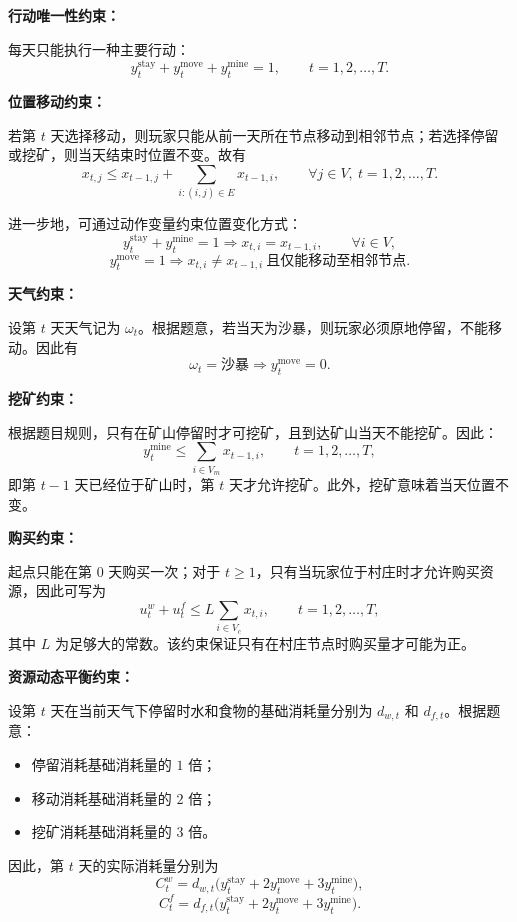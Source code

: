 \documentclass[UTF8,a4paper,12pt]{ctexart}
\begin{document}
\noindent\textbf{行动唯一性约束：}

每天只能执行一种主要行动：
\[
y_t^{\mathrm{stay}}+y_t^{\mathrm{move}}+y_t^{\mathrm{mine}}=1,\qquad t=1,2,\dots,T.
\]

\noindent\textbf{位置移动约束：}

若第 $t$ 天选择移动，则玩家只能从前一天所在节点移动到相邻节点；若选择停留或挖矿，则当天结束时位置不变。故有
\[
x_{t,j}\le x_{t-1,j}+\sum_{i:(i,j)\in E}x_{t-1,i},\qquad \forall j\in V,\ t=1,2,\dots,T.
\]

进一步地，可通过动作变量约束位置变化方式：
\[
y_t^{\mathrm{stay}}+y_t^{\mathrm{mine}}=1 \Longrightarrow x_{t,i}=x_{t-1,i},\qquad \forall i\in V,
\]
\[
y_t^{\mathrm{move}}=1 \Longrightarrow x_{t,i}\neq x_{t-1,i}\ \text{且仅能移动至相邻节点}.
\]

\noindent\textbf{天气约束：}

设第 $t$ 天天气记为 $\omega_t$。根据题意，若当天为沙暴，则玩家必须原地停留，不能移动。因此有
\[
\omega_t=\text{沙暴} \Longrightarrow y_t^{\mathrm{move}}=0.
\]

\noindent\textbf{挖矿约束：}

根据题目规则，只有在矿山停留时才可挖矿，且到达矿山当天不能挖矿。因此：
\[
y_t^{\mathrm{mine}}\le \sum_{i\in V_m}x_{t-1,i},\qquad t=1,2,\dots,T,
\]
即第 $t-1$ 天已经位于矿山时，第 $t$ 天才允许挖矿。此外，挖矿意味着当天位置不变。

\noindent\textbf{购买约束：}

起点只能在第 $0$ 天购买一次；对于 $t\ge 1$，只有当玩家位于村庄时才允许购买资源，因此可写为
\[
u_t^w+u_t^f \le L\sum_{i\in V_c}x_{t,i},\qquad t=1,2,\dots,T,
\]
其中 $L$ 为足够大的常数。该约束保证只有在村庄节点时购买量才可能为正。

\noindent\textbf{资源动态平衡约束：}

设第 $t$ 天在当前天气下停留时水和食物的基础消耗量分别为 $d_{w,t}$ 和 $d_{f,t}$。根据题意：

\begin{itemize}
    \item 停留消耗基础消耗量的 $1$ 倍；
    \item 移动消耗基础消耗量的 $2$ 倍；
    \item 挖矿消耗基础消耗量的 $3$ 倍。
\end{itemize}

因此，第 $t$ 天的实际消耗量分别为
\[
C_t^w=d_{w,t}\bigl(y_t^{\mathrm{stay}}+2y_t^{\mathrm{move}}+3y_t^{\mathrm{mine}}\bigr),
\]
\[
C_t^f=d_{f,t}\bigl(y_t^{\mathrm{stay}}+2y_t^{\mathrm{move}}+3y_t^{\mathrm{mine}}\bigr).
\]
\end{document}
